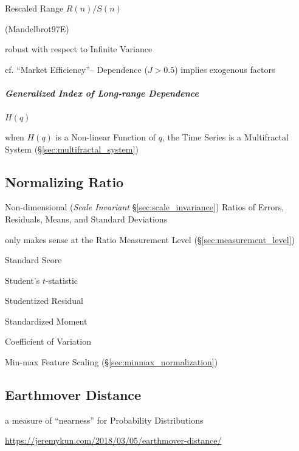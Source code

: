 Rescaled Range $R(n) / S(n)$

(Mandelbrot97E)

robust with respect to Infinite Variance

cf. ``Market Efficiency''-- Dependence ($J > 0.5$) implies exogenous factors



\subparagraph{Generalized Index of Long-range Dependence}
\label{sec:generalized_hurst}\hfill

$H(q)$

when $H(q)$ is a Non-linear Function of $q$, the Time Series is a Multifractal
System (\S\ref{sec:multifractal_system})



\subsection{Normalizing Ratio}\label{sec:normalizing_ratio}

Non-dimensional (\emph{Scale Invariant} \S\ref{sec:scale_invariance}) Ratios of
Errors, Residuals, Means, and Standard Deviations

only makes sense at the Ratio Measurement Level (\S\ref{sec:measurement_level})

Standard Score

Student's $t$-statistic

Studentized Residual

Standardized Moment

Coefficient of Variation

Min-max Feature Scaling (\S\ref{sec:minmax_normalization})



\subsection{Earthmover Distance}\label{sec:earthmover_distance}


a measure of ``nearness'' for Probability Distributions

\url{https://jeremykun.com/2018/03/05/earthmover-distance/}



